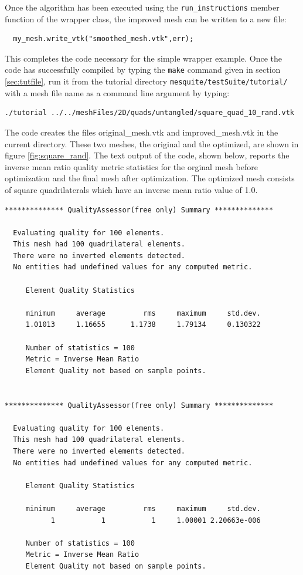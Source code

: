 Once the algorithm has been executed using the {\tt run\_instructions} member
function of the wrapper class, the improved mesh can be written to a new
file:
\begin{verbatim}
  my_mesh.write_vtk("smoothed_mesh.vtk",err); 
\end{verbatim}
This completes the code necessary for the simple wrapper example. Once
the code has successfully compiled by typing the {\tt make} command given in
section \ref{sec:tutfile}, 
run it from the tutorial directory \texttt{mesquite/testSuite/tutorial/}
with a mesh file name as a command line 
argument by typing: 
\begin{verbatim}
./tutorial ../../meshFiles/2D/quads/untangled/square_quad_10_rand.vtk
\end{verbatim}
The code creates the files original\_mesh.vtk
and improved\_mesh.vtk in the current directory.  These two meshes, the
original and the optimized, are
shown in figure \ref{fig:square_rand}.  The text output of the code,
shown below, reports the inverse mean ratio quality metric statistics for
the orginal mesh before optimization and the final mesh after optimization.
The optimized mesh consists
of square quadrilaterals which have an inverse mean ratio value of 1.0.
\begin{verbatim}
************** QualityAssessor(free only) Summary **************

  Evaluating quality for 100 elements.
  This mesh had 100 quadrilateral elements.
  There were no inverted elements detected.
  No entities had undefined values for any computed metric.

     Element Quality Statistics

     minimum     average         rms     maximum     std.dev.
     1.01013     1.16655      1.1738     1.79134     0.130322

     Number of statistics = 100
     Metric = Inverse Mean Ratio
     Element Quality not based on sample points.


************** QualityAssessor(free only) Summary **************

  Evaluating quality for 100 elements.
  This mesh had 100 quadrilateral elements.
  There were no inverted elements detected.
  No entities had undefined values for any computed metric.

     Element Quality Statistics

     minimum     average         rms     maximum     std.dev.
           1           1           1     1.00001 2.20663e-006

     Number of statistics = 100
     Metric = Inverse Mean Ratio
     Element Quality not based on sample points.
\end{verbatim}
